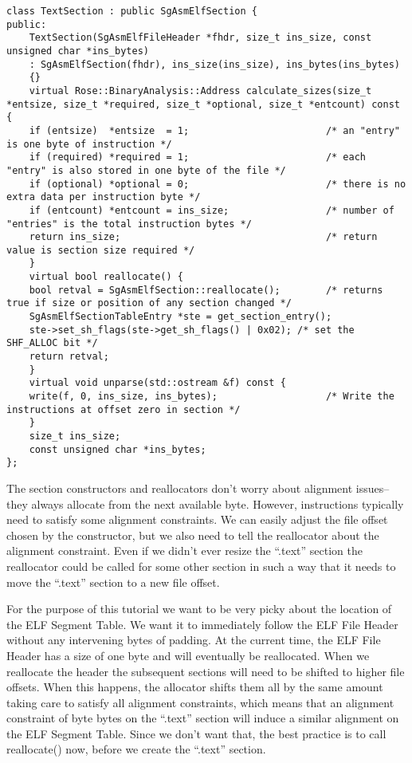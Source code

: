 \begin{verbatim}
class TextSection : public SgAsmElfSection {
public:
    TextSection(SgAsmElfFileHeader *fhdr, size_t ins_size, const unsigned char *ins_bytes)
	: SgAsmElfSection(fhdr), ins_size(ins_size), ins_bytes(ins_bytes)
	{}
    virtual Rose::BinaryAnalysis::Address calculate_sizes(size_t *entsize, size_t *required, size_t *optional, size_t *entcount) const {
	if (entsize)  *entsize  = 1;                        /* an "entry" is one byte of instruction */
	if (required) *required = 1;                        /* each "entry" is also stored in one byte of the file */
	if (optional) *optional = 0;                        /* there is no extra data per instruction byte */
	if (entcount) *entcount = ins_size;                 /* number of "entries" is the total instruction bytes */
	return ins_size;                                    /* return value is section size required */
    }
    virtual bool reallocate() {
	bool retval = SgAsmElfSection::reallocate();        /* returns true if size or position of any section changed */
	SgAsmElfSectionTableEntry *ste = get_section_entry();
	ste->set_sh_flags(ste->get_sh_flags() | 0x02); /* set the SHF_ALLOC bit */
	return retval;
    }
    virtual void unparse(std::ostream &f) const {
	write(f, 0, ins_size, ins_bytes);                   /* Write the instructions at offset zero in section */
    }
    size_t ins_size;
    const unsigned char *ins_bytes;
};
\end{verbatim}

The section constructors and reallocators don't worry about alignment
issues--they always allocate from the next available byte. However,
instructions typically need to satisfy some alignment constraints. We
can easily adjust the file offset chosen by the constructor, but we
also need to tell the reallocator about the alignment constraint. Even
if we didn't ever resize the ``.text'' section the reallocator could
be called for some other section in such a way that it needs to move
the ``.text'' section to a new file offset.

For the purpose of this tutorial we want to be very picky about the
location of the ELF Segment Table. We want it to immediately follow
the ELF File Header without any intervening bytes of padding. At the
current time, the ELF File Header has a size of one byte and will
eventually be reallocated. When we reallocate the header the
subsequent sections will need to be shifted to higher file
offsets. When this happens, the allocator shifts them all by the same
amount taking care to satisfy all alignment constraints, which means
that an alignment constraint of byte bytes on the ``.text'' section
will induce a similar alignment on the ELF Segment Table. Since we
don't want that, the best practice is to call reallocate() now, before
we create the ``.text'' section.

